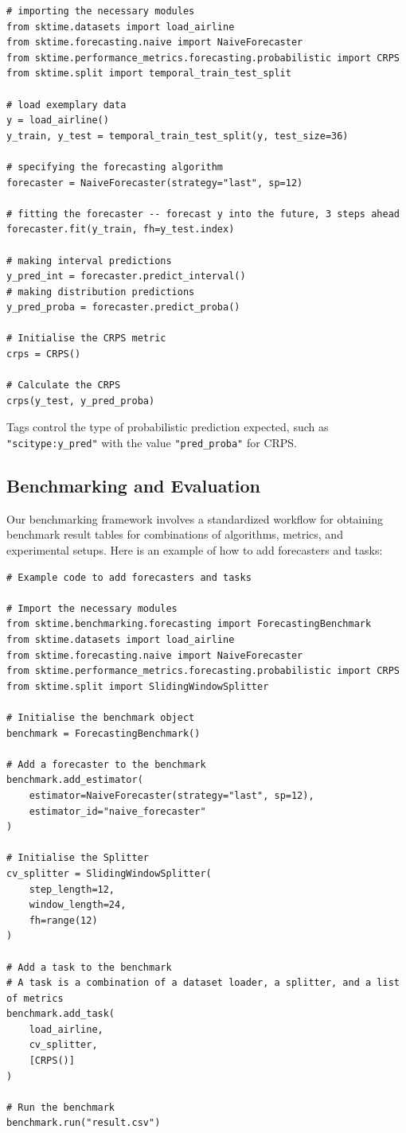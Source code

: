 \begin{verbatim}
# importing the necessary modules
from sktime.datasets import load_airline
from sktime.forecasting.naive import NaiveForecaster
from sktime.performance_metrics.forecasting.probabilistic import CRPS
from sktime.split import temporal_train_test_split

# load exemplary data
y = load_airline()
y_train, y_test = temporal_train_test_split(y, test_size=36)

# specifying the forecasting algorithm
forecaster = NaiveForecaster(strategy="last", sp=12)

# fitting the forecaster -- forecast y into the future, 3 steps ahead
forecaster.fit(y_train, fh=y_test.index)

# making interval predictions
y_pred_int = forecaster.predict_interval()
# making distribution predictions
y_pred_proba = forecaster.predict_proba()

# Initialise the CRPS metric
crps = CRPS()

# Calculate the CRPS
crps(y_test, y_pred_proba)
\end{verbatim}

Tags control the type of probabilistic prediction expected, such as \texttt{"scitype:y\_pred"} with the value \texttt{"pred\_proba"} for CRPS.

\subsection{Benchmarking and Evaluation}
Our benchmarking framework involves a standardized workflow for obtaining benchmark result tables for combinations of algorithms, metrics, and experimental setups. Here is an example of how to add forecasters and tasks:

\begin{verbatim}
# Example code to add forecasters and tasks

# Import the necessary modules
from sktime.benchmarking.forecasting import ForecastingBenchmark
from sktime.datasets import load_airline
from sktime.forecasting.naive import NaiveForecaster
from sktime.performance_metrics.forecasting.probabilistic import CRPS
from sktime.split import SlidingWindowSplitter

# Initialise the benchmark object
benchmark = ForecastingBenchmark()

# Add a forecaster to the benchmark
benchmark.add_estimator(
    estimator=NaiveForecaster(strategy="last", sp=12),
    estimator_id="naive_forecaster"
)     

# Initialise the Splitter
cv_splitter = SlidingWindowSplitter(
    step_length=12,
    window_length=24,
    fh=range(12)
)

# Add a task to the benchmark
# A task is a combination of a dataset loader, a splitter, and a list of metrics
benchmark.add_task(
    load_airline,
    cv_splitter,
    [CRPS()]
)

# Run the benchmark
benchmark.run("result.csv")
\end{verbatim}

